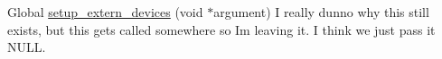 
\begin{DoxyRefList}
\item[Global \mbox{\hyperlink{uvfr__utils_8c_ab80c00a024c34da7f7926212ce10ef01}{setup\+\_\+extern\+\_\+devices}} (void $\ast$argument)]\label{deprecated__deprecated000001}%
%
I really dunno why this still exists, but this gets called somewhere so Im leaving it. I think we just pass it N\+U\+LL.
\end{DoxyRefList}
